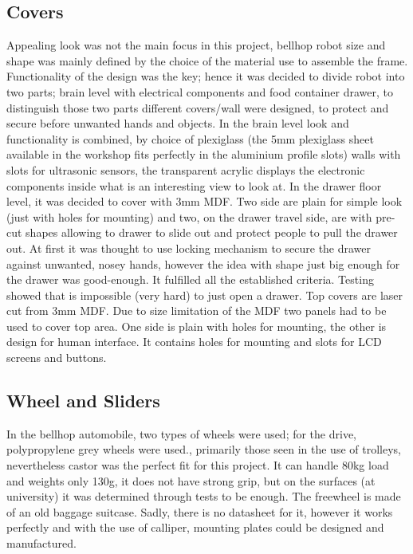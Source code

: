 \documentclass[11pt]{article}
\begin{document}
\subsection*{Covers}
Appealing look was not the main focus in this project, bellhop robot size and shape was mainly defined by the choice of the material use to assemble the frame. Functionality of the design was the key; hence it was decided to divide robot into two parts; brain level with electrical components and food container drawer, to distinguish those two parts different covers/wall were designed, to protect and secure before unwanted hands and objects. In the brain level look and functionality is combined, by choice of plexiglass (the 5mm plexiglass sheet available in the workshop fits perfectly in the aluminium profile slots) walls with slots for ultrasonic sensors, the transparent acrylic displays the electronic components inside what is an interesting view to look at. In the drawer floor level, it was decided to cover with 3mm MDF. Two side are plain for simple look (just with holes for mounting) and two, on the drawer travel side, are with pre-cut shapes allowing to drawer to slide out and protect people to pull the drawer out. At first it was thought to use locking mechanism to secure the drawer against unwanted, nosey hands, however the idea with shape just big enough for the drawer was good-enough. It fulfilled all the established criteria. Testing showed that is impossible (very hard) to just open a drawer. Top covers are laser cut from 3mm MDF. Due to size limitation of the MDF two panels had to be used to cover top area. One side is plain with holes for mounting, the other is design for human interface. It contains holes for mounting and slots for LCD screens and buttons.


\subsection*{Wheel and Sliders}
In the bellhop automobile, two types of wheels were used; for the drive, polypropylene grey wheels were used., primarily those seen in the use of trolleys, nevertheless castor was the perfect fit for this project. It can handle 80kg load and weights only 130g, it does not have strong grip, but on the surfaces (at university) it was determined through tests to be enough. The freewheel is made of an old baggage suitcase. Sadly, there is no datasheet for it, however it works perfectly and with the use of calliper, mounting plates could be designed and manufactured.
\end{document}
